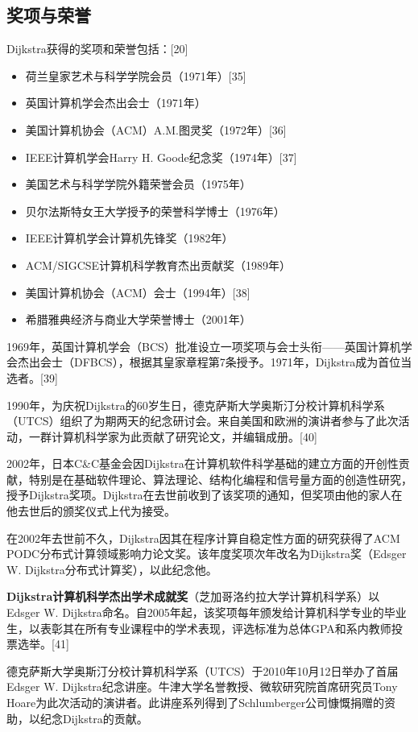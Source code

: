\subsection{奖项与荣誉}

Dijkstra获得的奖项和荣誉包括：[20]
\begin{itemize}
\item 荷兰皇家艺术与科学学院会员（1971年）[35]
\item 英国计算机学会杰出会士（1971年）
\item 美国计算机协会（ACM）A.M.图灵奖（1972年）[36]
\item IEEE计算机学会Harry H. Goode纪念奖（1974年）[37]
\item 美国艺术与科学学院外籍荣誉会员（1975年）
\item 贝尔法斯特女王大学授予的荣誉科学博士（1976年）
\item IEEE计算机学会计算机先锋奖（1982年）
\item ACM/SIGCSE计算机科学教育杰出贡献奖（1989年）
\item 美国计算机协会（ACM）会士（1994年）[38]
\item 希腊雅典经济与商业大学荣誉博士（2001年）
\end{itemize}
1969年，英国计算机学会（BCS）批准设立一项奖项与会士头衔——英国计算机学会杰出会士（DFBCS），根据其皇家章程第7条授予。1971年，Dijkstra成为首位当选者。[39]

1990年，为庆祝Dijkstra的60岁生日，德克萨斯大学奥斯汀分校计算机科学系（UTCS）组织了为期两天的纪念研讨会。来自美国和欧洲的演讲者参与了此次活动，一群计算机科学家为此贡献了研究论文，并编辑成册。[40]

2002年，日本C&C基金会因Dijkstra在计算机软件科学基础的建立方面的开创性贡献，特别是在基础软件理论、算法理论、结构化编程和信号量方面的创造性研究，授予Dijkstra奖项。Dijkstra在去世前收到了该奖项的通知，但奖项由他的家人在他去世后的颁奖仪式上代为接受。

在2002年去世前不久，Dijkstra因其在程序计算自稳定性方面的研究获得了ACM PODC分布式计算领域影响力论文奖。该年度奖项次年改名为Dijkstra奖（Edsger W. Dijkstra分布式计算奖），以此纪念他。

\textbf{Dijkstra计算机科学杰出学术成就奖}（芝加哥洛约拉大学计算机科学系）以Edsger W. Dijkstra命名。自2005年起，该奖项每年颁发给计算机科学专业的毕业生，以表彰其在所有专业课程中的学术表现，评选标准为总体GPA和系内教师投票选举。[41]

德克萨斯大学奥斯汀分校计算机科学系（UTCS）于2010年10月12日举办了首届Edsger W. Dijkstra纪念讲座。牛津大学名誉教授、微软研究院首席研究员Tony Hoare为此次活动的演讲者。此讲座系列得到了Schlumberger公司慷慨捐赠的资助，以纪念Dijkstra的贡献。